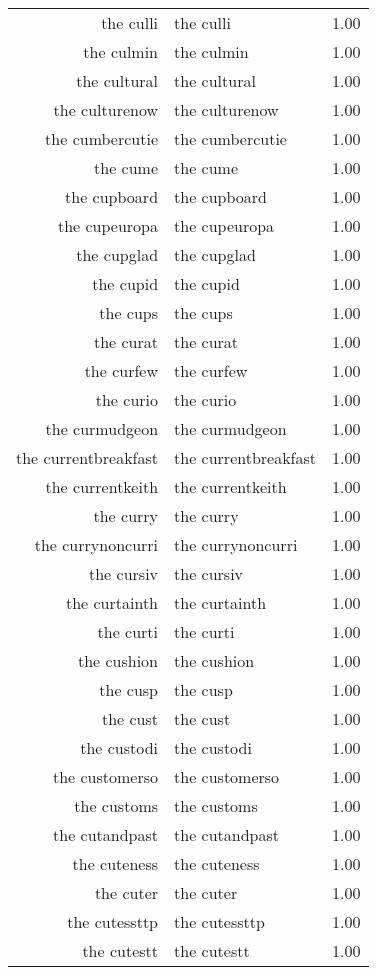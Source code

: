 \begin{table}[ht]
\begin{tabular}{rlr}
  the culli & the culli & 1.00 \\ 
  the culmin & the culmin & 1.00 \\ 
  the cultural & the cultural & 1.00 \\ 
  the culturenow & the culturenow & 1.00 \\ 
  the cumbercutie & the cumbercutie & 1.00 \\ 
  the cume & the cume & 1.00 \\ 
  the cupboard & the cupboard & 1.00 \\ 
  the cupeuropa & the cupeuropa & 1.00 \\ 
  the cupglad & the cupglad & 1.00 \\ 
  the cupid & the cupid & 1.00 \\ 
  the cups & the cups & 1.00 \\ 
  the curat & the curat & 1.00 \\ 
  the curfew & the curfew & 1.00 \\ 
  the curio & the curio & 1.00 \\ 
  the curmudgeon & the curmudgeon & 1.00 \\ 
  the currentbreakfast & the currentbreakfast & 1.00 \\ 
  the currentkeith & the currentkeith & 1.00 \\ 
  the curry & the curry & 1.00 \\ 
  the currynoncurri & the currynoncurri & 1.00 \\ 
  the cursiv & the cursiv & 1.00 \\ 
  the curtainth & the curtainth & 1.00 \\ 
  the curti & the curti & 1.00 \\ 
  the cushion & the cushion & 1.00 \\ 
  the cusp & the cusp & 1.00 \\ 
  the cust & the cust & 1.00 \\ 
  the custodi & the custodi & 1.00 \\ 
  the customerso & the customerso & 1.00 \\ 
  the customs & the customs & 1.00 \\ 
  the cutandpast & the cutandpast & 1.00 \\ 
  the cuteness & the cuteness & 1.00 \\ 
  the cuter & the cuter & 1.00 \\ 
  the cutessttp & the cutessttp & 1.00 \\ 
  the cutestt & the cutestt & 1.00 \\ 

\end{tabular}
\end{table}
